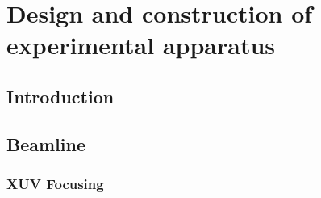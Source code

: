 \chapter{Design and construction of experimental apparatus}
\label{beamline}

\section{Introduction}
\label{intro_beamline}


\section{Beamline}
\label{sec:full_beamline}

\subsection{XUV Focusing}
\label{sec:XUV_focusing}

